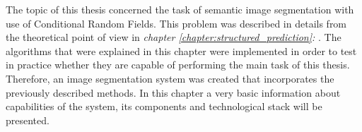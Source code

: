 The topic of this thesis concerned the task of semantic image segmentation with use of Conditional Random Fields. This problem was described in details from the theoretical point of view in \textit{chapter \ref{chapter:structured_prediction}: }. The algorithms that were explained in this chapter were implemented in order to test in practice whether they are capable of performing the main task of this thesis. Therefore, an image segmentation system was created that incorporates the previously described methods. In this chapter a very basic information about capabilities of the system, its components and technological stack will be presented. 